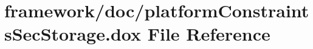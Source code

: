 \hypertarget{platform_constraints_sec_storage_8dox}{}\section{framework/doc/platform\+Constraints\+Sec\+Storage.dox File Reference}
\label{platform_constraints_sec_storage_8dox}
